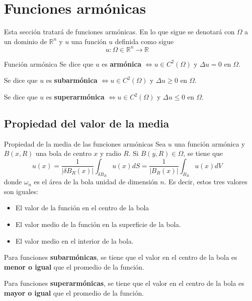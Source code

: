 \section{Funciones armónicas}
Esta sección tratará de funciones armónicas. En lo que sigue se denotará con $\Omega$ a un dominio de $\mathbb{R}^n$ y $u$ una función $u$ definida como sigue
$$u:\Omega \in \mathbb{R}^n \longrightarrow \mathbb{R}$$

\begin{definition}{Función armónica}
Se dice que $u$ es \textbf{armónica} $\iff u\in C^2(\Omega)$ y $\Delta u = 0$ en $\Omega$.

\noindent Se dice que $u$ es \textbf{subarmónica} $\iff u\in C^2(\Omega)$ y $\Delta u \ge 0$ en $\Omega$.

\noindent Se dice que $u$ es \textbf{superarmónica} $\iff u\in C^2(\Omega)$ y $\Delta u \le 0$ en $\Omega$.
\end{definition}

\subsection{Propiedad del valor de la media}
\begin{mathresult}{Propiedad de la media de las funciones armónicas}
Sea $u$ una función armónica y $B(x,R)$ una bola de centro $x$ y radio $R$. Si $\overline{B(y,R)}\in \Omega$, se tiene que 
$$u(x) = \frac{1}{|\delta B_R(x)|}\int_{\delta B_R} u(x)dS = \frac{1}{|B_R(x)|} \int_{B_R}u(x)dV$$
donde $\omega_n$ es el área de la bola unidad de dimensión $n$. Es decir, estos tres valores son iguales:
\begin{itemize}
\item El valor de la función en el centro de la bola
\item El valor medio de la función en la superficie de la bola.
\item El valor medio en el interior de la bola.
\end{itemize}

Para funciones \textbf{subarmónicas}, se tiene que el valor en el centro de la bola es \textbf{menor o igual} que el promedio de la función.

Para funciones \textbf{superarmónicas}, se tiene que el valor en el centro de la bola es \textbf{mayor o igual} que el promedio de la función.
\end{mathresult}

